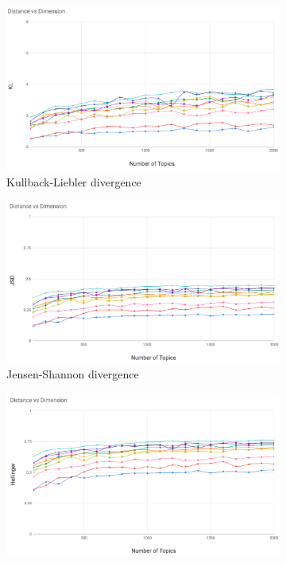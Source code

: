 \begin{figure}[ht]
\begin{subfigure}[b]{0.5\linewidth}
\centering
\includegraphics[width=\linewidth]{KL_100_2k.png}
\caption{Kullback-Liebler divergence}
\vspace{4ex}
\end{subfigure}
\begin{subfigure}[b]{0.5\linewidth}
\centering
\includegraphics[width=\linewidth]{JSD_100_2k.png}
\caption{Jensen-Shannon divergence}
\vspace{4ex}
\end{subfigure}
\begin{subfigure}[b]{0.5\linewidth}
\centering
\includegraphics[width=\linewidth]{He_100_2k.png}

\end{subfigure}
\end{figure}
